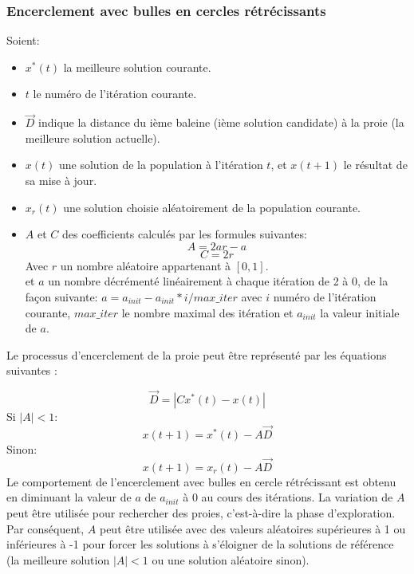 \documentclass[12pt]{article}
\begin{document}
\subsubsection{Encerclement avec bulles en cercles rétrécissants }
Soient:
\begin{itemize}
    \item \(x^*(t)\) la meilleure solution courante.
    \item \(t\) le numéro de l'itération courante.
    \item \(\vec{D}\) indique la distance du ième baleine (ième solution candidate) à la proie (la meilleure solution actuelle).
    \item \(x(t)\) une solution de la population à l'itération \(t\), et \(x(t+1)\) le résultat de sa mise à jour.
    \item \(x_r(t)\) une solution choisie aléatoirement de la population courante.
    \item \(A\) et \(C\) des coefficients calculés par les formules suivantes:
    \[A = 2ar-a\] 
    \[C = 2r\] 
    Avec \(r\) un nombre aléatoire appartenant à \([0,1]\).
    \\ et \(a\) un nombre décrémenté linéairement à chaque itération de 2 à 0, de la façon suivante:
    \(a =  a_{init} - a_{init}*i/max\_iter\) avec \(i\) numéro de l’itération courante, \(max\_iter\) le nombre maximal des itération et \(a_{init}\) la valeur initiale de \(a\).
\end{itemize}
Le processus d’encerclement de la proie peut être représenté par les équations suivantes :

\begin{equation*}
    \vec{D} = |Cx^*(t) - x(t)|
\end{equation*}
Si \(|A| < 1\):
\begin{equation}
    x(t+1) = x^*(t) - A\vec{D}
\end{equation}
Sinon:
\begin{equation}
    x(t+1) = x_r(t) - A\vec{D}
\end{equation}
Le comportement de l’encerclement avec bulles en cercle rétrécissant est obtenu en diminuant la valeur de \(a\) de \(a_{init}\) à 0 au cours des itérations. La variation de \(A\) peut être utilisée pour rechercher des proies, c'est-à-dire la phase d'exploration. Par conséquent, \(A\) peut être utilisée avec des valeurs aléatoires supérieures à 1 ou inférieures à -1 pour forcer les solutions à s'éloigner de la solutions de référence (la meilleure solution \(|A| < 1\) ou une solution aléatoire sinon).
\end{document}
